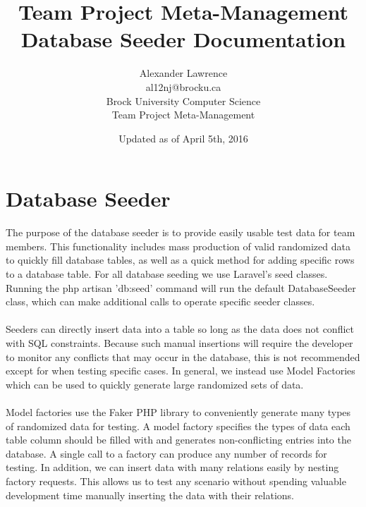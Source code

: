 \documentclass[]{article}
\title{Team Project Meta-Management \\ Database Seeder Documentation}
\author{Alexander Lawrence \\ al12nj@brocku.ca \\ Brock University Computer Science\\Team Project Meta-Management\\}
\date{Updated as of April 5th, 2016}
\begin{document}
\maketitle

\thispagestyle{fancy}


\section{Database Seeder}
The purpose of the database seeder is to provide easily usable test data for team members. This functionality includes mass production of valid randomized data to quickly fill database tables, as well as a quick method for adding specific rows to a database table. For all database seeding we use Laravel's seed classes. Running the php artisan 'db:seed' command will run the default DatabaseSeeder class, which can make additional calls to operate specific seeder classes.
\\\\
Seeders can directly insert data into a table so long as the data does not conflict with SQL constraints. Because such manual insertions will require the developer to monitor any conflicts that may occur in the database, this is not recommended except for when testing specific cases. In general, we instead use Model Factories which can be used to quickly generate large randomized sets of data. 
\\\\
Model factories use the Faker PHP library to conveniently generate many types of randomized data for testing. A model factory specifies the types of data each table column should be filled with and generates non-conflicting entries into the database. A single call to a factory can produce any number of records for testing. In addition, we can insert data with many relations easily by nesting factory requests. This allows us to test any scenario without spending valuable development time manually inserting the data with their relations.
\\

\pagebreak
{}
\end{document}
